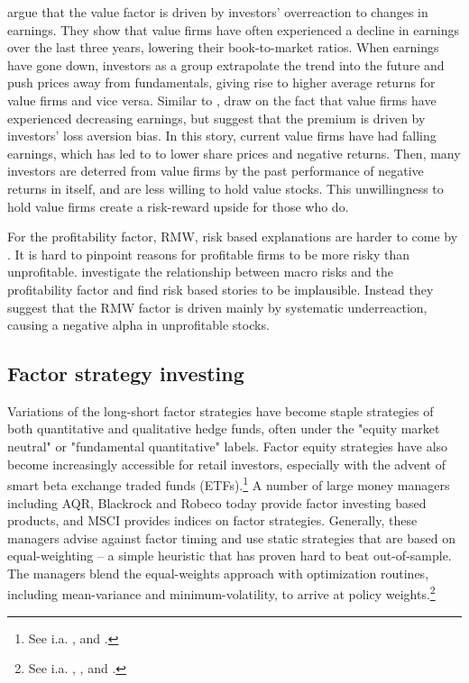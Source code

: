 \textcite{LakonishokShleiferVishny1994} argue that the value factor is driven by investors' overreaction to changes in earnings. They show that value firms have often experienced a decline in earnings over the last three years, lowering their book-to-market ratios. When earnings have gone down, investors as a group extrapolate the trend into the future and push prices away from fundamentals, giving rise to higher average returns for value firms and vice versa. Similar to \textcite{LakonishokShleiferVishny1994}, \textcite{BarberisHuang2001} draw on the fact that value firms have experienced decreasing earnings, but suggest that the premium is driven by investors' loss aversion bias. In this story, current value firms have had falling earnings, which has led to to lower share prices and negative returns. Then, many investors are deterred from value firms by the past performance of negative returns in itself, and are less willing to hold value stocks. This unwillingness to hold value firms create a risk-reward upside for those who do.

For the profitability factor, RMW, risk based explanations are harder to come by \autocite{NovyMarx2013}. It is hard to pinpoint reasons for profitable firms to be more risky than unprofitable. \textcite{Wang2013} investigate the relationship between macro risks and the profitability factor and find risk based stories to be implausible. Instead they suggest that the RMW factor is driven mainly by systematic underreaction, causing a negative alpha in unprofitable stocks.

\subsection{Factor strategy investing}
Variations of the long-short factor strategies have become staple strategies of both quantitative and qualitative hedge funds, often under the "equity market neutral" or "fundamental quantitative" labels. Factor equity strategies have also become increasingly accessible for retail investors, especially with the advent of smart beta exchange traded funds (ETFs).\footnote{See i.a. \textcite{Pedersen2015}, \textcite{AQREMN} and \textcite{McKEMN}.} A number of large money managers including AQR, Blackrock and Robeco today provide factor investing based products, and MSCI provides indices on factor strategies. Generally, these managers advise against factor timing and use static strategies that are based on equal-weighting -- a simple heuristic that has proven hard to beat out-of-sample. The managers blend the equal-weights approach with optimization routines, including mean-variance and minimum-volatility, to arrive at policy weights.\footnote{See i.a. \textcite{AQRSiren}, \textcite{BlackRock}, \textcite{MSCI} and \textcite{Robeco}.}

